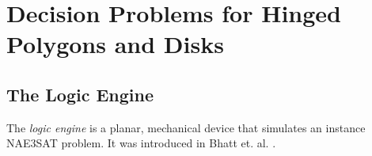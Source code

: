 \documentclass[10pt]{CSUNthesis}
\theoremstyle{plain}%
\theoremstyle{definition}
\theoremstyle{remark}
\begin{document}
\chapter{Decision Problems for Hinged Polygons and Disks}\label{chapter:logicEngine}

\section{The Logic Engine}
The \textit{logic engine} is a planar, mechanical device that simulates an instance NAE3SAT problem. It was introduced in Bhatt et. al. \cite{BC87}.
\end{document}
